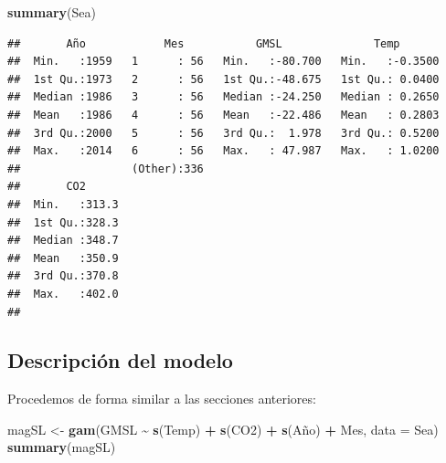 \documentclass[12pt,a4paper,]{book}
\newenvironment{Shaded}{\begin{snugshade}}{\end{snugshade}}
\newcommand{\AttributeTok}[1]{\textcolor[rgb]{0.13,0.29,0.53}{#1}}
\newcommand{\FunctionTok}[1]{\textcolor[rgb]{0.13,0.29,0.53}{\textbf{#1}}}
\newcommand{\NormalTok}[1]{#1}
\newcommand{\OtherTok}[1]{\textcolor[rgb]{0.56,0.35,0.01}{#1}}
\newcommand{\SpecialCharTok}[1]{\textcolor[rgb]{0.81,0.36,0.00}{\textbf{#1}}}
\numberwithin{dummy}{section}
\theoremstyle{ocrenumbox}
\theoremstyle{blacknumex}
\theoremstyle{blacknumbox}
\theoremstyle{ocrenum}
\theoremstyle{ocrenum}
\begin{document}
\begin{Shaded}
\begin{Highlighting}[]
\FunctionTok{summary}\NormalTok{(Sea)}
\end{Highlighting}
\end{Shaded}

\begin{verbatim}
##       Año            Mes           GMSL              Temp        
##  Min.   :1959   1      : 56   Min.   :-80.700   Min.   :-0.3500  
##  1st Qu.:1973   2      : 56   1st Qu.:-48.675   1st Qu.: 0.0400  
##  Median :1986   3      : 56   Median :-24.250   Median : 0.2650  
##  Mean   :1986   4      : 56   Mean   :-22.486   Mean   : 0.2803  
##  3rd Qu.:2000   5      : 56   3rd Qu.:  1.978   3rd Qu.: 0.5200  
##  Max.   :2014   6      : 56   Max.   : 47.987   Max.   : 1.0200  
##                 (Other):336                                      
##       CO2       
##  Min.   :313.3  
##  1st Qu.:328.3  
##  Median :348.7  
##  Mean   :350.9  
##  3rd Qu.:370.8  
##  Max.   :402.0  
## 
\end{verbatim}

\hypertarget{descripciuxf3n-del-modelo-1}{%
\subsection{Descripción del modelo}\label{descripciuxf3n-del-modelo-1}}

Procedemos de forma similar a las secciones anteriores:

\begin{Shaded}
\begin{Highlighting}[]
\NormalTok{magSL }\OtherTok{\textless{}{-}} \FunctionTok{gam}\NormalTok{(GMSL }\SpecialCharTok{\textasciitilde{}} \FunctionTok{s}\NormalTok{(Temp) }\SpecialCharTok{+} \FunctionTok{s}\NormalTok{(CO2) }\SpecialCharTok{+} \FunctionTok{s}\NormalTok{(Año) }\SpecialCharTok{+}\NormalTok{ Mes, }\AttributeTok{data =}\NormalTok{ Sea) }
\FunctionTok{summary}\NormalTok{(magSL)}
\end{Highlighting}
\end{Shaded}
\end{document}
